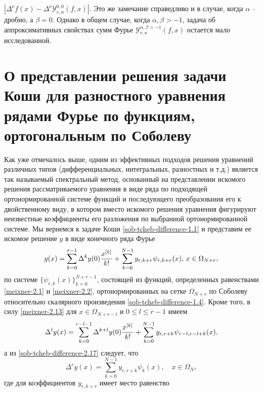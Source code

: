  $ |\Delta^\nu f(x)-\Delta^\nu\mathcal{Y}_{r,n}^{0,0}(f,x)|$. Это же замечание справедливо и в случае, когда $\alpha$ -- дробно, а $\beta=0$. Однако в общем случае, когда $\alpha,\beta>-1$, задача об аппроксимативных свойствах сумм Фурье
 $\mathcal{Y}_{r,n}^{\alpha,\beta>-1}(f,x)$ остается мало исследованной.

\section{О представлении решения задачи Коши для разностного уравнения рядами Фурье по функциям, ортогональным по Соболеву}

Как уже отмечалось выше, одним из эффективных подходов решения уравнений различных типов
(дифференциальных, интегральных, разностных и т.д.) является \cite{sob-tcheb-difference-SolDmEg, sob-tcheb-difference-Tref1, sob-tcheb-difference-Tref2} так называемый спектральный метод, основанный на представлении искомого решения рассматриваемого уравнения в виде ряда по подходящей ортонормированной системе функций  и последующего  преобразования его к двойственному виду, в котором вместо искомого решения уравнения фигурируют  неизвестные коэффициенты его разложения по выбранной ортонормированной системе. Мы вернемся к задаче Коши \eqref{sob-tcheb-difference-1.1} и представим ее искомое решение $y$ в виде конечного ряда Фурье
\begin{equation}\label{sob-tcheb-difference-8.1}
 y(x)= \sum_{k=0}^{r-1}\Delta^ky(0){x^{[k]}\over k!} +\sum_{k=0}^{N-1}y_{r,k+r} \psi_{r,k+r}(x),\, x\in \Omega_{N+r},
  \end{equation}
по системе  $\{\psi_{r,k}(x)\}_{k=0}^{N+r-1}$, состоящей из функций, определенных равенствами   \eqref{meixner-2.1} и \eqref{meixner-2.2}, ортонормированных на сетке $\Omega_{N+r}$ по Соболеву относительно скалярного произведения \eqref{sob-tcheb-difference-1.4}. Кроме того, в силу \eqref{meixner-2.13} для $x\in \Omega_{N+r-l} $ и  $0\le l\le r-1$ имеем
\begin{equation}\label{sob-tcheb-difference-8.2}
 \Delta^l y(x)= \sum_{k=0}^{r-l-1}\Delta^{k+l}y(0){x^{[k]}\over k!} +\sum_{k=0}^{N-1} y_{r,r+k} \psi_{r-l,r-l+k}(x),
  \end{equation}
а из \eqref{sob-tcheb-difference-2.17} следует, что
 \begin{equation}\label{sob-tcheb-difference-8.3}
 \Delta^r y(x)= \sum_{k=0}^{N-1} y_{r,r+k} \psi_{k}(x), \quad x\in \Omega_{N},
  \end{equation}
где для коэффициентов $y_{r,k+r}$ имеет место равенство
